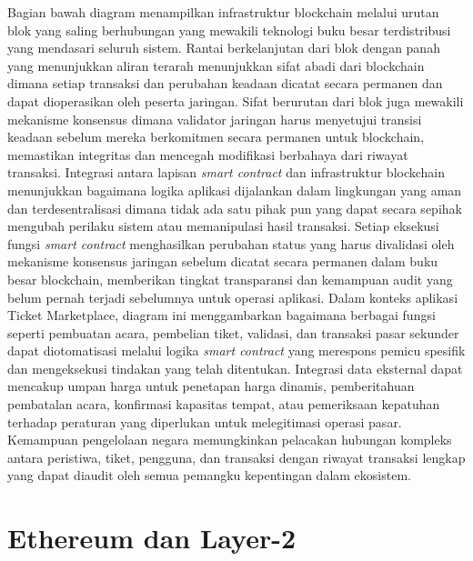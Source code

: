 Bagian bawah diagram menampilkan infrastruktur blockchain melalui urutan blok
yang saling berhubungan yang mewakili teknologi buku besar terdistribusi yang
mendasari seluruh sistem. Rantai berkelanjutan dari blok dengan panah yang
menunjukkan aliran terarah menunjukkan sifat abadi dari blockchain dimana
setiap transaksi dan perubahan keadaan dicatat secara permanen dan dapat
dioperasikan oleh peserta jaringan. Sifat berurutan dari blok juga mewakili
mekanisme konsensus dimana validator jaringan harus menyetujui transisi keadaan
sebelum mereka berkomitmen secara permanen untuk blockchain, memastikan
integritas dan mencegah modifikasi berbahaya dari riwayat transaksi. Integrasi
antara lapisan \emph{smart contract} dan infrastruktur blockchain menunjukkan
bagaimana logika aplikasi dijalankan dalam lingkungan yang aman dan
terdesentralisasi dimana tidak ada satu pihak pun yang dapat secara sepihak
mengubah perilaku sistem atau memanipulasi hasil transaksi. Setiap eksekusi
fungsi \emph{smart contract} menghasilkan perubahan status yang harus
divalidasi oleh mekanisme konsensus jaringan sebelum dicatat secara permanen
dalam buku besar blockchain, memberikan tingkat transparansi dan kemampuan
audit yang belum pernah terjadi sebelumnya untuk operasi aplikasi. Dalam
konteks aplikasi Ticket Marketplace, diagram ini menggambarkan bagaimana
berbagai fungsi seperti pembuatan acara, pembelian tiket, validasi, dan
transaksi pasar sekunder dapat diotomatisasi melalui logika \emph{smart
  contract} yang merespons pemicu spesifik dan mengeksekusi tindakan yang telah
ditentukan. Integrasi data eksternal dapat mencakup umpan harga untuk penetapan
harga dinamis, pemberitahuan pembatalan acara, konfirmasi kapasitas tempat,
atau pemeriksaan kepatuhan terhadap peraturan yang diperlukan untuk
melegitimasi operasi pasar. Kemampuan pengelolaan negara memungkinkan pelacakan
hubungan kompleks antara peristiwa, tiket, pengguna, dan transaksi dengan
riwayat transaksi lengkap yang dapat diaudit oleh semua pemangku kepentingan
dalam ekosistem.
\section{Ethereum dan Layer-2}
\label{sec:ethereumdanlayer2}


